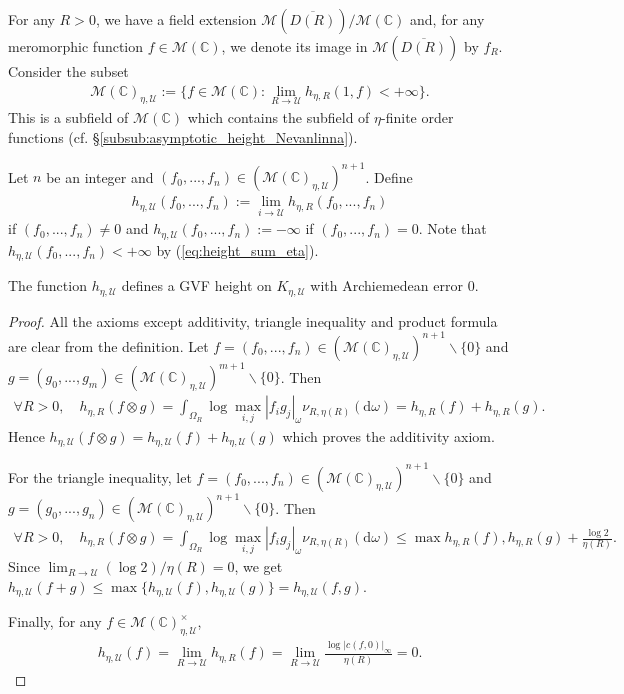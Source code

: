 \documentclass [11pt,reqno]{amsart}
\def\bC{{\mathbb{C}}}
\newcommand{\1}{\mathmybb{1}}
\def\cM{{\mathcal{M}}}
\def\cU{{\mathcal{U}}}
\def\diff{\mathrm{d}}
\def\setminus{\smallsetminus}
\begin{document}
For any $R>0$, we have a field extension $\cM(\overline{D(R)})/\cM(\bC)$ and, for any meromorphic function $f\in \cM(\bC)$, we denote its image in $\cM(\overline{D(R)})$ by $f_{R}$. Consider the subset 
\begin{align*}
\cM(\bC)_{\eta,\cU} := \{f\in \cM(\bC) : \displaystyle\lim_{R\to\cU} h_{\eta,R}(1,f)<+\infty\}.
\end{align*}
This is a subfield of $\cM(\bC)$ which contains the subfield of $\eta$-finite order functions (cf. \S \ref{subsub:asymptotic_height_Nevanlinna}). 

Let $n$ be an integer and $(f_{0},...,f_{n})\in (\cM(\bC)_{\eta,\cU})^{n+1}$. Define 
\begin{align*}
h_{\eta,\cU}(f_{0},...,f_{n}) := \displaystyle\lim_{i\to\cU} h_{\eta,R}(f_{0},...,f_{n})
\end{align*}
if $(f_{0},...,f_{n})\neq 0$ and $h_{\eta,\cU}(f_{0},...,f_{n}):=-\infty$ if $(f_{0},...,f_{n})=0$. Note that $h_{\eta,\cU}(f_{0},...,f_{n})<+\infty$ by (\ref{eq:height_sum_eta}). 

\begin{proposition}
\label{prop:height_eta_Nevanlinna}
The function $h_{\eta,\cU}$ defines a GVF height on $K_{\eta,\cU}$ with Archiemedean error $0$.
\end{proposition}

\begin{proof}
All the axioms except additivity, triangle inequality and product formula are clear from the definition. Let $f=(f_{0},...,f_{n})\in (\cM(\bC)_{\eta,\cU})^{n+1}\setminus\{0\}$ and $g=(g_{0},...,g_{m})\in (\cM(\bC)_{\eta,\cU})^{m+1}\setminus\{0\}$. Then
\begin{align*}
\forall R>0, \quad h_{\eta,R}(f\otimes g) = \int_{\Omega_{R}} \log\displaystyle\max_{i,j}|f_{i}g_{j}|_{\omega} \nu_{R,\eta(R)}(\diff\omega)= h_{\eta,R}(f)+h_{\eta,R}(g).
\end{align*}
Hence $h_{\eta,\cU}(f\otimes g) = h_{\eta,\cU}(f)+h_{\eta,\cU}(g)$ which proves the additivity axiom. 

For the triangle inequality, let $f=(f_{0},...,f_{n})\in (\cM(\bC)_{\eta,\cU})^{n+1}\setminus\{0\}$ and $g=(g_{0},...,g_{n})\in (\cM(\bC)_{\eta,\cU})^{n+1}\setminus\{0\}$. Then 
\begin{align*}
\forall R>0, \quad h_{\eta,R}(f\otimes g) = \int_{\Omega_{R}} \log\displaystyle\max_{i,j}|f_{i}g_{j}|_{\omega} \nu_{R,\eta(R)}(\diff\omega)\leq \max{h_{\eta,R}(f),h_{\eta,R}(g)}+\frac{\log 2}{\eta(R)}.
\end{align*}
Since $\lim_{R\to\cU}(\log 2)/\eta(R) = 0$, we get $h_{\eta,\cU}(f+g)\leq \max\{h_{\eta,\cU}(f),h_{\eta,\cU}(g)\} = h_{\eta,\cU}(f,g)$.

Finally, for any $f\in \cM(\bC)_{\eta,\cU}^{\times}$, 
\begin{align*}
h_{\eta,\cU}(f)=\displaystyle\lim_{R\to \cU} h_{\eta,R}(f)=\lim_{R\to \cU}\frac{\log|c(f,0)|_{\infty}}{\eta(R)}=0. 
\end{align*}
\end{proof}
\end{document}
